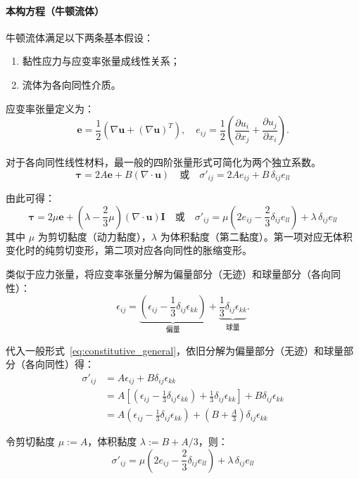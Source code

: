 \paragraph{本构方程（牛顿流体）}
牛顿流体满足以下两条基本假设：
\begin{enumerate}
    \item 黏性应力与应变率张量成线性关系；
    \item 流体为各向同性介质。
\end{enumerate}

应变率张量定义为：
\begin{equation}
\mathbf{e} = \frac{1}{2} \left( \nabla \mathbf{u} + (\nabla \mathbf{u})^T \right), \quad e_{ij} = \frac{1}{2}\left( \frac{\partial u_i}{\partial x_j} + \frac{\partial u_j}{\partial x_i} \right).
\end{equation}

对于各向同性线性材料，最一般的四阶张量形式可简化为两个独立系数。
\begin{equation}\label{eq:constitutive_general}
\boldsymbol{\tau} = 2A\mathbf{e} + B (\nabla \cdot \mathbf{u})
\quad \text{或}\quad \sigma'_{ij} = 2Ae_{ij} + B \, \delta_{ij}e_{ll}
\end{equation}

由此可得：
\begin{equation}\label{eq:constitutive_newtonian}
\boldsymbol{\tau} = 2\mu \mathbf{e} + \left( \lambda - \frac{2}{3}\mu \right) (\nabla \cdot \mathbf{u}) \mathbf{I}
\quad \text{或}\quad 
\sigma'_{ij} = \mu \left(2e_{ij} - \frac{2}{3} \delta_{ij} e_{ll}\right) + \lambda \, \delta_{ij}e_{ll}
\end{equation}
其中 $\mu$ 为剪切黏度（动力黏度），$\lambda$ 为体积黏度（第二黏度）。第一项对应无体积变化时的纯剪切变形，第二项对应各向同性的胀缩变形。

\begin{explain}
类似于应力张量，将应变率张量分解为偏量部分（无迹）和球量部分（各向同性）：
\begin{equation}
\epsilon_{ij} = \underbrace{\left(\epsilon_{ij} - \frac{1}{3}\delta_{ij}\epsilon_{kk}\right)}_{\text{偏量}} + \underbrace{\frac{1}{3}\delta_{ij}\epsilon_{kk}}_{\text{球量}}.
\end{equation}

代入一般形式~\eqref{eq:constitutive_general}，依旧分解为偏量部分（无迹）和球量部分（各向同性）得：
\[
\begin{aligned}
\sigma'_{ij} &= A \epsilon_{ij} + B \delta_{ij}\epsilon_{kk} \\
&= A\left[\left(\epsilon_{ij} - \frac{1}{3}\delta_{ij}\epsilon_{kk}\right) + \frac{1}{3}\delta_{ij}\epsilon_{kk}\right] + B\delta_{ij}\epsilon_{kk} \\
&= A\left(\epsilon_{ij} - \frac{1}{3}\delta_{ij}\epsilon_{kk}\right) + \left(B + \frac{A}{3}\right)\delta_{ij}\epsilon_{kk}
\end{aligned}
\]

令剪切黏度 $\mu := A$，体积黏度 $\lambda := B + A/3$，则：
\[
\sigma'_{ij} = \mu \left(2e_{ij} - \frac{2}{3} \delta_{ij} e_{ll}\right) + \lambda \, \delta_{ij}e_{ll}
\]
\end{explain}

